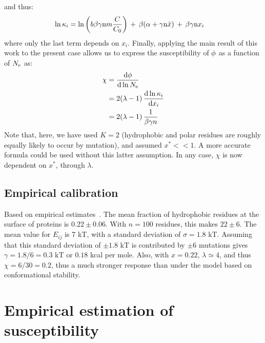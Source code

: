 and thus:
\begin{align}
\ln \kappa_i & = \ln \left( b \beta \gamma \text{n} m \frac{C}{C_0}  \right) \, + \, \beta (\alpha +\gamma \text{n} \bar x) \, + \, \beta \gamma\text{n} x_i
\end{align}
where only the last term depends on $x_i$.
Finally, applying the main result of this work to the present case allows us to express the susceptibility of $\phi$ as a function of $N_{\mathrm{e}}$ as:
\begin{align}
\chi & = \frac{\mathrm{d}\phi} {\mathrm{d} \ln N_{\mathrm{e}}} 
\\ & =  2(\lambda - 1) \, \frac{\mathrm{d}\ln \kappa_i}{\mathrm{d} x_i} 
\\ & =  2 (\lambda - 1) \, \frac{1}{\beta \gamma n}
\end{align}
Note that, here, we have used $K=2$ (hydrophobic and polar residues are roughly equally likely to occur by mutation), and assumed $x^* << 1$. A more accurate formula could be used without this latter assumption. In any case, $\chi$ is now dependent on $x^*$, through $\lambda$.
\subsection{Empirical calibration}
Based on empirical estimates~\citep{Zhang2008}. The mean fraction of hydrophobic residues at the surface of proteins is $0.22 \pm 0.06$. With $n=100$ residues, this makes $22 \pm 6$.
The mean value for $E_{ij}$ is 7 kT, with a standard deviation of $\sigma = 1.8$ kT. Assuming that this standard deviation of $\pm 1.8$ kT is contributed by $\pm 6$ mutations gives $\gamma = 1.8 / 6 = 0.3$ kT or $0.18$ kcal per mole.
Also, with $x=0.22$, $\lambda \simeq 4$, and thus $\chi = 6  / 30 = 0.2$, thus a much stronger response than under the model based on conformational stability.

\section{Empirical estimation of susceptibility}


